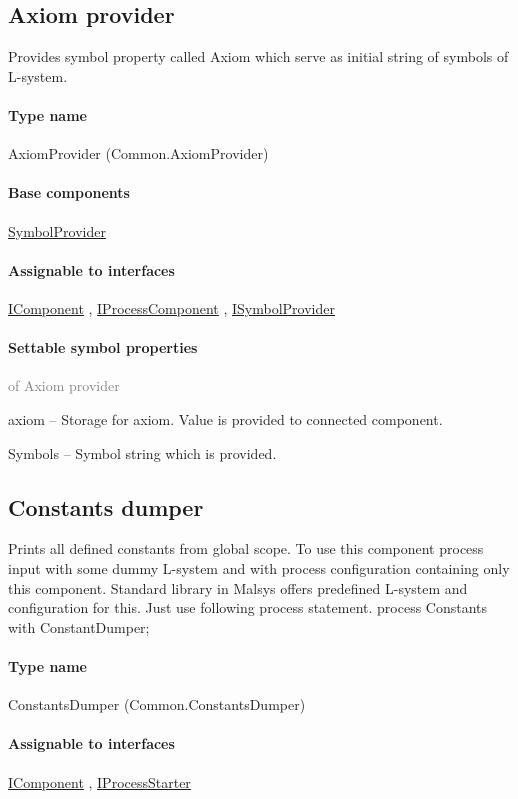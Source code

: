\subsection{Axiom provider}
\label{Malsys.Processing.Components.Common.AxiomProvider}
Provides symbol property called Axiom which serve as initial string of symbols of L-system.\paragraph{Type name}
AxiomProvider (Common.AxiomProvider) 	\paragraph{Base components}
		\hyperref[Malsys.Processing.Components.Common.SymbolProvider]{SymbolProvider}%
	\paragraph{Assignable to interfaces}
		\hyperref[Malsys.Processing.Components.IComponent]{IComponent}%
, 		\hyperref[Malsys.Processing.Components.IProcessComponent]{IProcessComponent}%
, 		\hyperref[Malsys.Processing.Components.ISymbolProvider]{ISymbolProvider}%
	\paragraph{Settable symbol properties}\textcolor{gray}{of Axiom provider}
	\begin{description*}
		\item[axiom]
			-- Storage for axiom.
            Value is provided to connected component.
		\item[Symbols]
			-- Symbol string which is provided.
	\end{description*}
	


\subsection{Constants dumper}
\label{Malsys.Processing.Components.Common.ConstantsDumper}
Prints all defined constants from global scope.
            To use this component process input with some dummy L-system and
            with process configuration containing only this component.
            Standard library in Malsys offers predefined L-system and configuration for this.
            Just use following process statement.
            process Constants with ConstantDumper;\paragraph{Type name}
ConstantsDumper (Common.ConstantsDumper) 	\paragraph{Assignable to interfaces}
		\hyperref[Malsys.Processing.Components.IComponent]{IComponent}%
, 		\hyperref[Malsys.Processing.Components.IProcessStarter]{IProcessStarter}%
